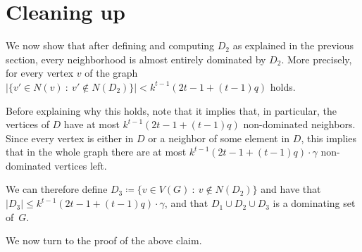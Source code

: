 
\section{Cleaning up}

We now show that after defining and computing $D_2$ as explained in the
previous section, every neighborhood is almost entirely dominated by $D_2$.
More precisely, for every vertex $v$ of the graph
$|\{v'\in N(v) ~:~ v' \not\in N(D_2)\}| <  k^{t-1}(2t-1+(t-1)q)$ holds.

Before explaining why this holds, note that it implies that,
in particular, the vertices of $D$ have at most
$ k^{t-1}(2t-1+(t-1)q)$ non-dominated neighbors. Since every vertex is
either in $D$ or a
neighbor of some element in $D$, this implies that in the whole
graph there are at most $ k^{t-1}(2t-1+(t-1)q)\cdot \gamma$ non-dominated vertices left.

\begin{tcolorbox}
We can therefore define $D_3 \coloneqq \{v\in V(G) ~:~ v\not\in N(D_2) \}$
and have that $|D_3|\le  k^{t-1}(2t-1+(t-1)q)\cdot \gamma$, and that $D_1\cup D_2\cup D_3$ is a dominating
set of~$G$. 
\end{tcolorbox}

We now turn to the proof of the above claim.

